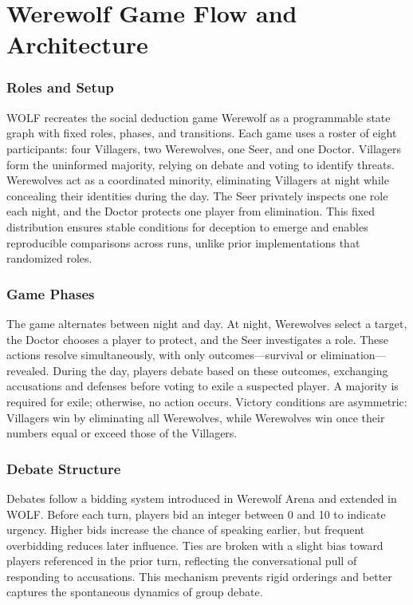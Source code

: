 \documentclass{article}
\begin{document}
\section{Werewolf Game Flow and Architecture}
\label{subsec:Werewolf Game Flow and Architecture}

\subsubsection*{Roles and Setup}
WOLF recreates the social deduction game Werewolf as a programmable state graph with fixed roles, phases, and transitions. Each game uses a roster of eight participants: four Villagers, two Werewolves, one Seer, and one Doctor. Villagers form the uninformed majority, relying on debate and voting to identify threats. Werewolves act as a coordinated minority, eliminating Villagers at night while concealing their identities during the day. The Seer privately inspects one role each night, and the Doctor protects one player from elimination. This fixed distribution ensures stable conditions for deception to emerge and enables reproducible comparisons across runs, unlike prior implementations that randomized roles.  

\subsubsection*{Game Phases}
The game alternates between night and day. At night, Werewolves select a target, the Doctor chooses a player to protect, and the Seer investigates a role. These actions resolve simultaneously, with only outcomes—survival or elimination—revealed. During the day, players debate based on these outcomes, exchanging accusations and defenses before voting to exile a suspected player. A majority is required for exile; otherwise, no action occurs. Victory conditions are asymmetric: Villagers win by eliminating all Werewolves, while Werewolves win once their numbers equal or exceed those of the Villagers.  

\subsubsection*{Debate Structure}
\label{subsec:debate structure}
Debates follow a bidding system introduced in Werewolf Arena \cite{bailis2024werewolfarenacasestudy} and extended in WOLF. Before each turn, players bid an integer between 0 and 10 to indicate urgency. Higher bids increase the chance of speaking earlier, but frequent overbidding reduces later influence. Ties are broken with a slight bias toward players referenced in the prior turn, reflecting the conversational pull of responding to accusations. This mechanism prevents rigid orderings and better captures the spontaneous dynamics of group debate.  
\end{document}
